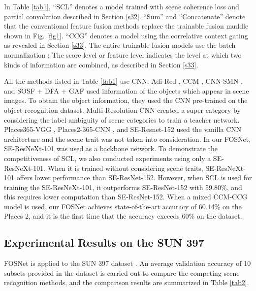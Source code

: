 \documentclass[journal,comsoc]{IEEEtran}
\begin{document}
In Table \ref{tab1}, ``SCL'' denotes a model trained with scene coherence loss and partial convolution \cite{b24} described in Section \ref{s32}. ``Sum'' and ``Concatenate'' denote that the conventional feature fusion methods replace the trainable fusion muddle shown in Fig. \ref{fig1}. ``CCG'' denotes a model using the correlative context gating as revealed in Section \ref{s33}. The entire trainable fusion models use the batch normalization \cite{b32}; The score level or feature level indicates the level at which two kinds of information are combined, as described in Section \ref{s33}.

All the methods listed in Table \ref{tab1} use CNN: Adi-Red \cite{b6}, CCM \cite{b21}, CNN-SMN \cite{b13}, and SOSF + DFA + GAF \cite{b4} used information of the objects which appear in scene images. To obtain the object information, they used the CNN pre-trained on the object recognition dataset. Multi-Resolution CNN \cite{b5} created a super category by considering the label ambiguity of scene categories to train a teacher network. Places365-VGG \cite{b20}, Places2-365-CNN \cite{b45}, and SE-Resnet-152 \cite{b28} used the vanilla CNN architecture and the scene trait was not taken into consideration. In our FOSNet, SE-ResNeXt-101 was used as a backbone network. To demonstrate the competitiveness of SCL, we also conducted experiments using only a SE-ResNeXt-101. When it is trained without considering scene traits, SE-ResNeXt-101 offers lower performance than SE-ResNet-152. However, when SCL is used for training the SE-ResNeXt-101, it outperforms SE-ResNet-152 \cite{b28} with 59.80\%, and this requires lower computation than SE-ResNet-152. When a mixed CCM-CCG model is used, our FOSNet achieves state-of-the-art accuracy of 60.14\% on the Places 2, and it is the first time that the accuracy exceeds 60\% on the dataset.



\subsection{Experimental Results on the SUN 397}
\label{s44}
FOSNet is applied to the SUN 397 dataset \cite{b33}. An average validation accuracy of 10 subsets provided in the dataset is carried out to compare the competing scene recognition methods, and the comparison results are summarized in Table \ref{tab2}.
\end{document}
